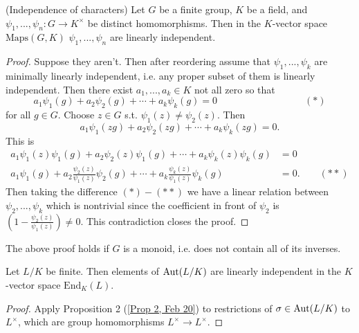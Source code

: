 \begin{prop} \label{Prop 2, Feb 20}
	(Independence of characters) Let $G$ be a finite group, $K$ be a field, and $\psi_1, ..., \psi_n : G \rightarrow K^{\times}$ be distinct homomorphisms. Then in the $K$-vector space $\text{Maps}(G, K)$ $\psi_1, ..., \psi_n$ are linearly independent.
\end{prop}

\begin{proof}
	Suppose they aren't. Then after reordering assume that $\psi_1, ..., \psi_k$ are minimally linearly independent, i.e. any proper subset of them is linearly independent. Then there exist $a_1, ..., a_k \in K$ not all zero so that
		\[a_1\psi_1(g) + a_2\psi_2(g) + \cdots + a_k\psi_k(g) = 0 \quad \qquad \qquad \qquad \qquad (\ast)\]
	for all $g \in G$. Choose $z \in G$ s.t. $\psi_1(z) \neq \psi_2(z)$. Then
		\[a_1\psi_1(zg) + a_2\psi_2(zg) + \cdots + a_k\psi_k(zg) = 0.\]
	This is
		\begin{align*}
			a_1\psi_1(z)\psi_1(g) + a_2\psi_2(z)\psi_1(g) + \cdots + a_k\psi_k(z)\psi_k(g) &= 0 \\
			a_1\psi_1(g) + a_2\frac{\psi_2(z)}{\psi_1(z)}\psi_2(g) + \cdots + a_k\frac{\psi_k(z)}{\psi_1(z)}\psi_k(g) &= 0. \qquad (\ast \ast)
		\end{align*}
	Then taking the difference $(\ast) - (\ast \ast)$ we have a linear relation between $\psi_2, ..., \psi_k$ which is nontrivial since the coefficient in front of $\psi_2$ is $\left( 1 - \frac{\psi_2(z)}{\psi_1(z)} \right) \neq 0$. This contradiction closes the proof.
\end{proof}

\begin{rmk}
	The above proof holds if $G$ is a monoid, i.e. does not contain all of its inverses.
\end{rmk}

\begin{cor} \label{Cor 3, Feb 20}
	Let $L/K$ be finite. Then elements of $\operatorname{Aut}(L/K)$ are linearly independent in the $K$-vector space $\text{End}_K(L)$.
\end{cor}

\begin{proof}
	Apply Proposition 2 (\ref{Prop 2, Feb 20}) to restrictions of $\sigma \in \operatorname{Aut}(L/K)$ to $L^{\times}$, which are group homomorphisms $L^{\times} \rightarrow L^{\times}$.
\end{proof}

